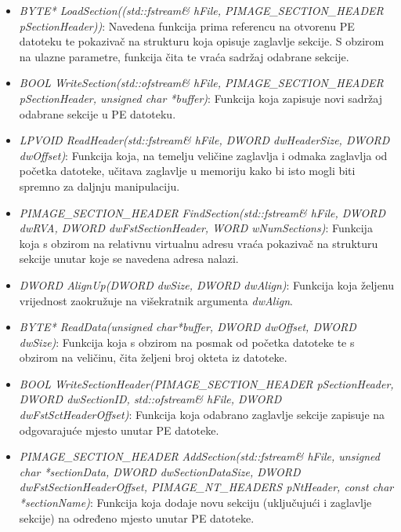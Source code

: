\documentclass[times, utf8, diplomski, numeric]{fer}
\begin{document}
\begin{itemize}

\item {\footnotesize \emph{BYTE* LoadSection((std::fstream\&
hFile, PIMAGE\_SECTION\_HEADER pSectionHeader))}}: Navedena
funkcija prima referencu na otvorenu PE datoteku te pokazivač na
strukturu koja opisuje zaglavlje sekcije. S obzirom na ulazne
parametre, funkcija čita te vraća sadržaj odabrane sekcije.

\item {\footnotesize \emph{BOOL WriteSection(std::ofstream\&
hFile, PIMAGE\_SECTION\_HEADER pSectionHeader, unsigned char
*buffer)}}: Funkcija koja zapisuje novi sadržaj odabrane sekcije
u PE datoteku.

\item {\footnotesize \emph{LPVOID ReadHeader(std::fstream\&
hFile, DWORD dwHeaderSize, DWORD dwOffset)}}: Funkcija koja, na
temelju veličine zaglavlja i odmaka zaglavlja od početka
datoteke, učitava zaglavlje u memoriju kako bi isto mogli biti
spremno za daljnju manipulaciju.

\item {\footnotesize \emph{PIMAGE\_SECTION\_HEADER
FindSection(std::fstream\& hFile, DWORD dwRVA, DWORD
dwFstSectionHeader, WORD wNumSections)}}: Funkcija koja s obzirom
na relativnu virtualnu adresu vraća pokazivač na strukturu
sekcije unutar koje se navedena adresa nalazi.

\item {\footnotesize \emph{DWORD AlignUp(DWORD dwSize, DWORD
dwAlign)}}: Funkcija koja željenu vrijednost zaokružuje na
višekratnik argumenta \emph{dwAlign}.

\item {\footnotesize \emph{BYTE* ReadData(unsigned char*buffer,
DWORD dwOffset, DWORD dwSize)}}: Funkcija koja s obzirom na
posmak od početka datoteke te s obzirom na veličinu, čita željeni
broj okteta iz datoteke.

\item {\footnotesize \emph{BOOL
WriteSectionHeader(PIMAGE\_SECTION\_HEADER pSectionHeader, DWORD
dwSectionID, std::ofstream\& hFile, DWORD
dwFstSctHeaderOffset)}}: Funkcija koja odabrano zaglavlje sekcije
zapisuje na odgovarajuće mjesto unutar PE datoteke.

\item {\footnotesize \emph{PIMAGE\_SECTION\_HEADER
AddSection(std::fstream\& hFile, unsigned char *sectionData,
DWORD dwSectionDataSize, DWORD dwFstSectionHeaderOffset,
PIMAGE\_NT\_HEADERS pNtHeader, const char *sectionName)}}:
Funkcija koja dodaje novu sekciju (uključujući i zaglavlje
sekcije) na određeno mjesto unutar PE datoteke.


\end{itemize}
\end{document}
